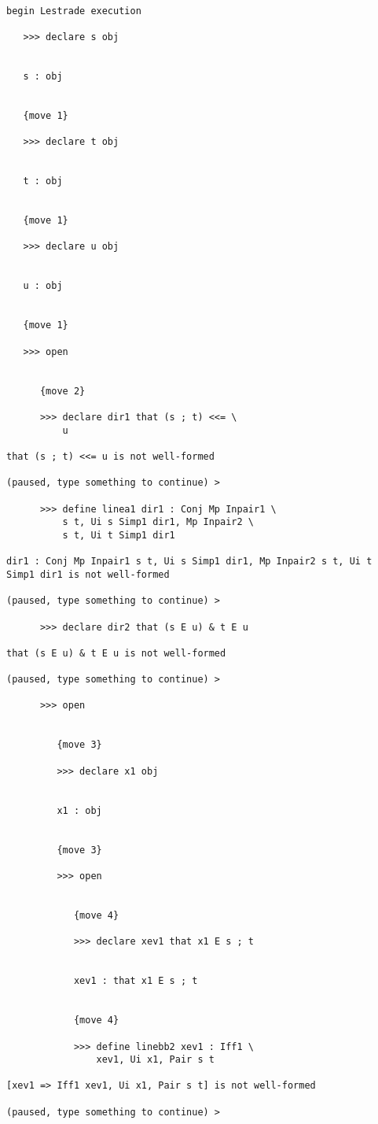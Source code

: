 \documentclass[12pt]{article}
\begin{document}
\begin{verbatim}

begin Lestrade execution

   >>> declare s obj


   s : obj


   {move 1}

   >>> declare t obj


   t : obj


   {move 1}

   >>> declare u obj


   u : obj


   {move 1}

   >>> open


      {move 2}

      >>> declare dir1 that (s ; t) <<= \
          u

that (s ; t) <<= u is not well-formed

(paused, type something to continue) >

      >>> define linea1 dir1 : Conj Mp Inpair1 \
          s t, Ui s Simp1 dir1, Mp Inpair2 \
          s t, Ui t Simp1 dir1

dir1 : Conj Mp Inpair1 s t, Ui s Simp1 dir1, Mp Inpair2 s t, Ui t Simp1 dir1 is not well-formed

(paused, type something to continue) >

      >>> declare dir2 that (s E u) & t E u

that (s E u) & t E u is not well-formed

(paused, type something to continue) >

      >>> open


         {move 3}

         >>> declare x1 obj


         x1 : obj


         {move 3}

         >>> open


            {move 4}

            >>> declare xev1 that x1 E s ; t


            xev1 : that x1 E s ; t


            {move 4}

            >>> define linebb2 xev1 : Iff1 \
                xev1, Ui x1, Pair s t

[xev1 => Iff1 xev1, Ui x1, Pair s t] is not well-formed

(paused, type something to continue) >


\end{verbatim}
\end{document}
